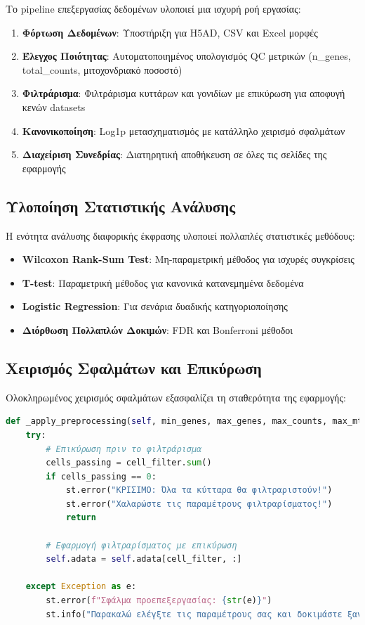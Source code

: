 \documentclass[11pt,a4paper]{article}
\begin{document}
Το pipeline επεξεργασίας δεδομένων υλοποιεί μια ισχυρή ροή εργασίας:

\begin{enumerate}
    \item \textbf{Φόρτωση Δεδομένων}: Υποστήριξη για H5AD, CSV και Excel μορφές
    \item \textbf{Έλεγχος Ποιότητας}: Αυτοματοποιημένος υπολογισμός QC μετρικών (n\_genes, total\_counts, μιτοχονδριακό ποσοστό)
    \item \textbf{Φιλτράρισμα}: Φιλτράρισμα κυττάρων και γονιδίων με επικύρωση για αποφυγή κενών datasets
    \item \textbf{Κανονικοποίηση}: Log1p μετασχηματισμός με κατάλληλο χειρισμό σφαλμάτων
    \item \textbf{Διαχείριση Συνεδρίας}: Διατηρητική αποθήκευση σε όλες τις σελίδες της εφαρμογής
\end{enumerate}

\subsection{Υλοποίηση Στατιστικής Ανάλυσης}

Η ενότητα ανάλυσης διαφορικής έκφρασης υλοποιεί πολλαπλές στατιστικές μεθόδους:

\begin{itemize}
    \item \textbf{Wilcoxon Rank-Sum Test}: Μη-παραμετρική μέθοδος για ισχυρές συγκρίσεις
    \item \textbf{T-test}: Παραμετρική μέθοδος για κανονικά κατανεμημένα δεδομένα
    \item \textbf{Logistic Regression}: Για σενάρια δυαδικής κατηγοριοποίησης
    \item \textbf{Διόρθωση Πολλαπλών Δοκιμών}: FDR και Bonferroni μέθοδοι
\end{itemize}

\subsection{Χειρισμός Σφαλμάτων και Επικύρωση}

Ολοκληρωμένος χειρισμός σφαλμάτων εξασφαλίζει τη σταθερότητα της εφαρμογής:

\begin{lstlisting}[language=Python, caption={Παράδειγμα Ισχυρού Χειρισμού Σφαλμάτων}]
def _apply_preprocessing(self, min_genes, max_genes, max_counts, max_mt, min_cells):
    try:
        # Επικύρωση πριν το φιλτράρισμα
        cells_passing = cell_filter.sum()
        if cells_passing == 0:
            st.error("ΚΡΙΣΙΜΟ: Όλα τα κύτταρα θα φιλτραριστούν!")
            st.error("Χαλαρώστε τις παραμέτρους φιλτραρίσματος!")
            return
        
        # Εφαρμογή φιλτραρίσματος με επικύρωση
        self.adata = self.adata[cell_filter, :]
        
    except Exception as e:
        st.error(f"Σφάλμα προεπεξεργασίας: {str(e)}")
        st.info("Παρακαλώ ελέγξτε τις παραμέτρους σας και δοκιμάστε ξανά")
\end{lstlisting}
\end{document}

